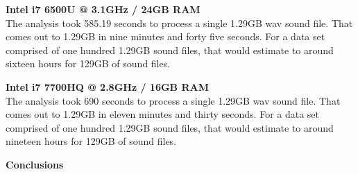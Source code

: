 \noindent\textbf{Intel i7 6500U @ 3.1GHz / 24GB RAM}\\
The analysis took 585.19 seconds to process a single 1.29GB wav sound file. That comes out to 1.29GB in nine minutes and forty five seconds. For a data set comprised of one hundred 1.29GB sound files, that would estimate to around sixteen hours for 129GB of sound files.

\noindent\textbf{Intel i7 7700HQ @ 2.8GHz / 16GB RAM}\\
The analysis took 690 seconds to process a single 1.29GB wav sound file. That comes out to 1.29GB in eleven minutes and thirty seconds. For a data set comprised of one hundred 1.29GB sound files, that would estimate to around nineteen hours for 129GB of sound files.


\noindent\textbf{Conclusions}
